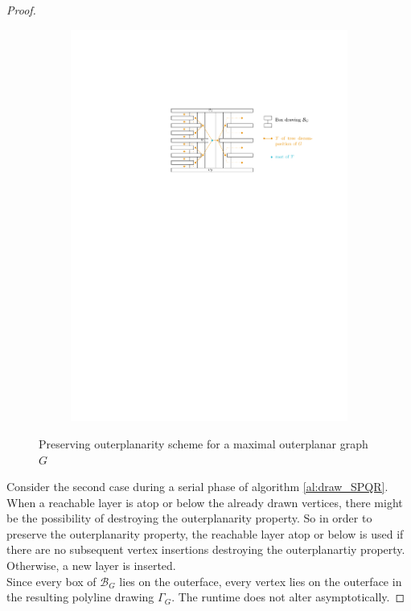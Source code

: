 \begin{proof}
\begin{figure}[H]
	\begin{subfigure}{\textwidth}
		\centering
		\includegraphics[page=1,width=\linewidth]{graphics/maximal_outerplanar_preserving_outerplanartiy_scheme.pdf}
	\end{subfigure}
	\caption{Preserving outerplanarity scheme for a maximal outerplanar graph $G$}\label{im:maximal_outerplanar_preserving_outerplanartiy_scheme}
\end{figure}
Consider the second case during a serial phase of algorithm \ref{al:draw_SPQR}. When a reachable layer is atop or below the already drawn vertices, there might be the possibility of destroying the outerplanarity property. So in order to preserve the outerplanarity property, the reachable layer atop or below is used if there are no subsequent vertex insertions destroying the outerplanartiy property. Otherwise, a new layer is inserted.\\
Since every box of $\mathcal{B}_{G}$ lies on the outerface, every vertex lies on the outerface in the resulting polyline drawing $\Gamma_{G}$. The runtime does not alter asymptotically. 
\end{proof}
